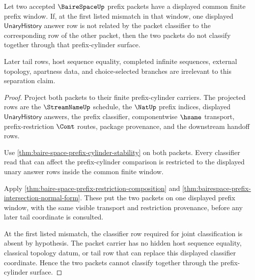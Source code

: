 \begin{theorem}
\label{thm:bairespace-prefix-cylinder-separation}
Let two accepted $\BaireSpaceUp$ prefix packets have a displayed common finite
prefix window. If, at the first listed mismatch in that window, one displayed
$\mathsf{UnaryHistory}$ answer row is not related by the packet classifier to
the corresponding row of the other packet, then the two packets do not classify
together through that prefix-cylinder surface.

Later tail rows, host sequence equality, completed infinite sequences,
external topology, apartness data, and choice-selected branches are irrelevant
to this separation claim.
\end{theorem}
\begin{proof}
Project both packets to their finite prefix-cylinder carriers. The projected
rows are the $\StreamNameUp$ schedule, the $\NatUp$ prefix indices, displayed
$\mathsf{UnaryHistory}$ answers, the prefix classifier, componentwise
$\hsame$ transport, prefix-restriction $\Cont$ routes, package provenance, and
the downstream handoff rows.

Use \autoref{thm:baire-space-prefix-cylinder-stability} on both packets. Every
classifier read that can affect the prefix-cylinder comparison is restricted
to the displayed unary answer rows inside the common finite window.

Apply \autoref{thm:baire-space-prefix-restriction-composition} and
\autoref{thm:bairespace-prefix-intersection-normal-form}. These put the two
packets on one displayed prefix window, with the same visible transport and
restriction provenance, before any later tail coordinate is consulted.

At the first listed mismatch, the classifier row required for joint
classification is absent by hypothesis. The packet carrier has no hidden host
sequence equality, classical topology datum, or tail row that can replace this
displayed classifier coordinate. Hence the two packets cannot classify
together through the prefix-cylinder surface.
\end{proof}


